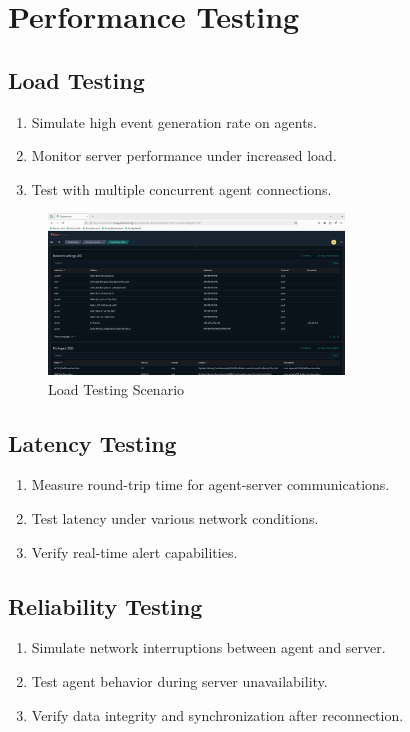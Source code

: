 \section{Performance Testing}
\subsection{Load Testing}
\begin{enumerate}
    \item Simulate high event generation rate on agents.
    \item Monitor server performance under increased load.
    \item Test with multiple concurrent agent connections.
\end{enumerate}

\begin{figure}[h]
    \centering
    \includegraphics[width=0.7\textwidth]{openarmor-agent/7.png}
    \caption{Load Testing Scenario}
    \label{fig:load-testing}
\end{figure}

\subsection{Latency Testing}
\begin{enumerate}
    \item Measure round-trip time for agent-server communications.
    \item Test latency under various network conditions.
    \item Verify real-time alert capabilities.
\end{enumerate}

\subsection{Reliability Testing}
\begin{enumerate}
    \item Simulate network interruptions between agent and server.
    \item Test agent behavior during server unavailability.
    \item Verify data integrity and synchronization after reconnection.
\end{enumerate}

